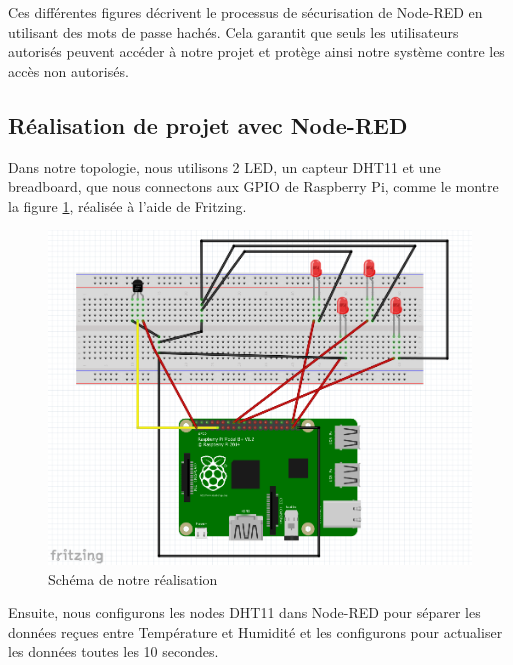 Ces différentes figures décrivent le processus de sécurisation de Node-RED en utilisant des mots de passe hachés. Cela garantit que seuls les utilisateurs autorisés peuvent accéder à notre projet et protège ainsi notre système contre les accès non autorisés.

\subsection{Réalisation de projet avec Node-RED}

Dans notre topologie, nous utilisons 2 LED, un capteur DHT11 et une breadboard, que nous connectons aux GPIO de Raspberry Pi, comme le montre la figure \ref{Chap4.3.13}, réalisée à l'aide de Fritzing.

\begin{figure}[H]
\centering
\includegraphics[width=15cm]{Images/RaspberryVisual.png}
\caption{Schéma de notre réalisation}
\label{Chap4.3.13}
\end{figure}

Ensuite, nous configurons les nodes DHT11 dans Node-RED pour séparer les données reçues entre Température et Humidité et les configurons pour actualiser les données toutes les 10 secondes.

